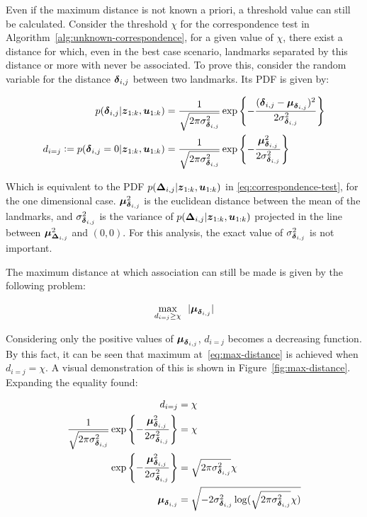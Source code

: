 Even if the maximum distance is not known a priori, a threshold value can still be calculated. Consider the threshold $\chi$ for the correspondence test in Algorithm~\ref{alg:unknown-correspondence}, for a given value of $\chi$, there exist a distance for which, even in the best case scenario, landmarks separated by this distance or more with never be associated. To prove this, consider the random variable for the distance  $\boldsymbol{\delta}_{i,j}$ between two landmarks. Its PDF is given by:

\begin{align}
p(\boldsymbol{\delta}_{i,j}|\boldsymbol{z}_{1:k},\boldsymbol{u}_{1:k})&=
\frac{1}{\sqrt{2\pi\sigma_{\boldsymbol{\delta}_{i,j}}^2}}
\exp\left\lbrace -\frac{(\boldsymbol{\delta}_{i,j}-\boldsymbol{\mu}_{\boldsymbol{\delta}_{i,j}})^2}{2\sigma_{\boldsymbol{\delta}_{i,j}}^2}\right\rbrace\\
d_{i=j} \vcentcolon= p(\boldsymbol{\delta}_{i,j}=0|\boldsymbol{z}_{1:k},\boldsymbol{u}_{1:k})&=
\frac{1}{\sqrt{2\pi\sigma_{\boldsymbol{\delta}_{i,j}}^2}}
\exp\left\lbrace -\frac{\boldsymbol{\mu}_{\boldsymbol{\delta}_{i,j}}^2}{2\sigma_{\boldsymbol{\delta}_{i,j}}^2}\right\rbrace 
\end{align}

Which is equivalent to the PDF $p(\boldsymbol{\Delta}_{i,j}|\boldsymbol{z}_{1:k},\boldsymbol{u}_{1:k})$ in \eqref{eq:correspondence-test}, for the one dimensional case. $\boldsymbol{\mu}_{\boldsymbol{\delta}_{i,j}}^2$ is the euclidean distance between the mean of the landmarks, and $\sigma_{\boldsymbol{\delta}_{i,j}}^2$ is the variance of $p(\boldsymbol{\Delta}_{i,j}|\boldsymbol{z}_{1:k},\boldsymbol{u}_{1:k})$ projected in the line between $\boldsymbol{\mu}_{\boldsymbol{\Delta}_{i,j}}^2$ and $(0,0)$. For this analysis, the exact value of $\sigma_{\boldsymbol{\delta}_{i,j}}^2$ is not important.

The maximum distance at which association can still be made is given by the following problem:

\begin{equation}
\underset{d_{i=j}\geq\chi}{\text{max}}~~  |\boldsymbol{\mu}_{\boldsymbol{\delta}_{i,j}}|
\label{eq:max-distance}
\end{equation}

Considering only the positive values of $\boldsymbol{\mu}_{\boldsymbol{\delta}_{i,j}}$, $d_{i=j}$ becomes a decreasing function. By this fact, it can be seen that maximum at~\eqref{eq:max-distance} is achieved when $d_{i=j}=\chi$. A visual demonstration of this is shown in Figure~\ref{fig:max-distance}. Expanding the equality found:

\begin{align}
d_{i=j} &= \chi\\
\frac{1}{\sqrt{2\pi\sigma_{\boldsymbol{\delta}_{i,j}}^2}}
\exp\left\lbrace -\frac{\boldsymbol{\mu}_{\boldsymbol{\delta}_{i,j}}^2}{2\sigma_{\boldsymbol{\delta}_{i,j}}^2}\right\rbrace &= \chi \\
\exp\left\lbrace -\frac{\boldsymbol{\mu}_{\boldsymbol{\delta}_{i,j}}^2}{2\sigma_{\boldsymbol{\delta}_{i,j}}^2}\right\rbrace&= \sqrt{2\pi\sigma_{\boldsymbol{\delta}_{i,j}}^2} \chi\\
\boldsymbol{\mu}_{\boldsymbol{\delta}_{i,j}} &= \sqrt{-2\sigma_{\boldsymbol{\delta}_{i,j}}^2\log(\sqrt{2\pi\sigma_{\boldsymbol{\delta}_{i,j}}^2} \chi)} \label{eq:max-distance-exp}
\end{align}

